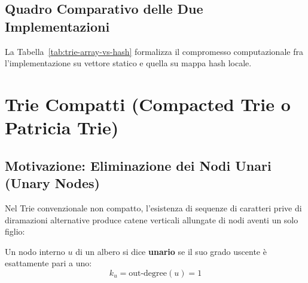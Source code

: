 \FloatBarrier
\subsection{Quadro Comparativo delle Due Implementazioni}
\label{subsec:quadro-comparativo-trie-standard}

La Tabella~\ref{tab:trie-array-vs-hash} formalizza il compromesso computazionale fra l'implementazione su vettore statico e quella su mappa hash locale.

\begin{table}[H]
\centering
\small
{}
\caption{Confronto di efficienza asintotica tra l'implementazione su array statico e l'implementazione su tabella hash locale per l'MSD Radix Sort.}
\label{tab:trie-array-vs-hash}
\end{table}

\FloatBarrier
\section{Trie Compatti (Compacted Trie o Patricia Trie)}
\label{sec:trie-compatti-patricia}

\FloatBarrier
\subsection{Motivazione: Eliminazione dei Nodi Unari (Unary Nodes)}
\label{subsec:motivazione-dropping-unary}

Nel Trie convenzionale non compatto, l'esistenza di sequenze di caratteri prive di diramazioni alternative produce catene verticali allungate di nodi aventi un solo figlio:
\begin{definition}
Un nodo interno $u$ di un albero si dice \textbf{unario} se il suo grado uscente \`e esattamente pari a uno:
\begin{equation}
  k_u = \text{out-degree}(u) = 1
\end{equation}
\end{definition}


